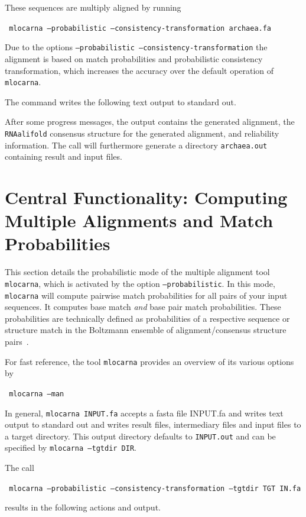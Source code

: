 \documentclass{article}
\newenvironment{ttbox}{%
  \begin{framed}\begin{minipage}{1.0\textwidth}\tt}%
{\end{minipage}\end{framed}\noindent}
\begin{document}
These sequences are multiply aligned by running
\begin{ttbox}
  mlocarna --probabilistic --consistency-transformation archaea.fa
\end{ttbox}
Due to the options \texttt{--probabilistic
  --consistency-transformation} the alignment is based on match
probabilities and probabilistic consistency transformation, which increases the accuracy over the default operation of \texttt{mlocarna}.

The command writes the following text output to standard out.
\begin{framed}
  
\end{framed}

After some progress messages, the output contains the generated
alignment, the \texttt{RNAalifold} consensus structure for the
generated alignment, and reliability information.  The call will
furthermore generate a directory \texttt{archaea.out} containing
result and input files.


\section{Central Functionality: Computing Multiple Alignments and
  Match Probabilities}

This section details the probabilistic mode of the multiple alignment
tool \texttt{mlocarna}, which is activated by the option
\texttt{--probabilistic}.
%
In this mode, \texttt{mlocarna} will compute pairwise match
probabilities for all pairs of your input sequences. It computes base
match \emph{and} base pair match probabilities. These probabilities
are technically defined as probabilities of a respective sequence or
structure match in the Boltzmann ensemble of alignment/consensus
structure pairs~\cite{Will:LocARNAP:unpublished}.

For fast reference, the tool \texttt{mlocarna} provides an overview of
its various options by
\begin{ttbox}
  mlocarna --man
\end{ttbox}

In general, \texttt{mlocarna INPUT.fa} accepts a fasta file INPUT.fa
and writes text output to standard out and writes result files,
intermediary files and input files to a target directory. This output
directory defaults to \texttt{INPUT.out} and can be specified by
\texttt{mlocarna --tgtdir DIR}.

The call
\begin{ttbox}
  mlocarna --probabilistic --consistency-transformation --tgtdir TGT IN.fa 
\end{ttbox}
results in the following actions and output.
\end{document}
